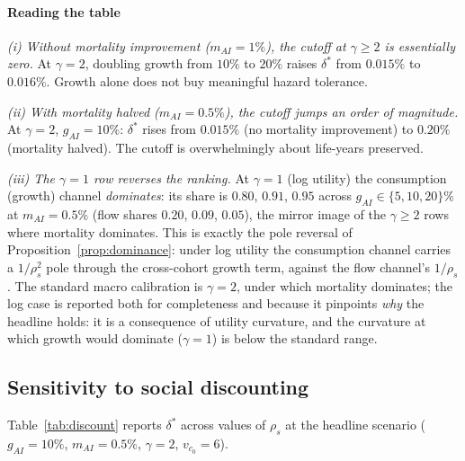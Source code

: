 \documentclass{_latex/house}
\begin{document}
\paragraph{Reading the table}

\emph{(i) Without mortality improvement ($m_{AI} = 1\%$), the cutoff at $\gamma \geq 2$ is essentially zero.} At $\gamma = 2$, doubling growth from $10\%$ to $20\%$ raises $\delta^*$ from $0.015\%$ to $0.016\%$. Growth alone does not buy meaningful hazard tolerance.

\emph{(ii) With mortality halved ($m_{AI} = 0.5\%$), the cutoff jumps an order of magnitude.} At $\gamma = 2$, $g_{AI} = 10\%$: $\delta^*$ rises from $0.015\%$ (no mortality improvement) to $0.20\%$ (mortality halved). The cutoff is overwhelmingly about life-years preserved.

\emph{(iii) The $\gamma = 1$ row reverses the ranking.} At $\gamma = 1$ (log utility) the consumption (growth) channel \emph{dominates}: its share is $0.80$, $0.91$, $0.95$ across $g_{AI}\in\{5,10,20\}\%$ at $m_{AI}=0.5\%$ (flow shares $0.20$, $0.09$, $0.05$), the mirror image of the $\gamma\ge2$ rows where mortality dominates. This is exactly the pole reversal of Proposition~\ref{prop:dominance}: under log utility the consumption channel carries a $1/\rho_s^2$ pole through the cross-cohort growth term, against the flow channel's $1/\rho_s$. The standard macro calibration is $\gamma = 2$, under which mortality dominates; the log case is reported both for completeness and because it pinpoints \emph{why} the headline holds: it is a consequence of utility curvature, and the curvature at which growth would dominate ($\gamma=1$) is below the standard range.

\subsection{Sensitivity to social discounting}

Table~\ref{tab:discount} reports $\delta^*$ across values of $\rho_s$ at the headline scenario ($g_{AI} = 10\%$, $m_{AI} = 0.5\%$, $\gamma = 2$, $v_{c_0} = 6$).
\end{document}
